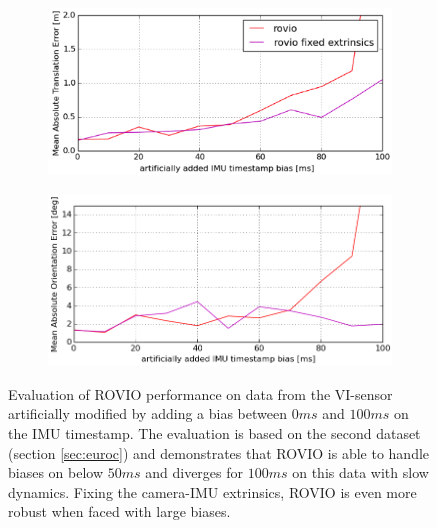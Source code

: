 \begin{figure}[h]
  \begin{subfigure}[b]{0.48\textwidth}
    \includegraphics[width=\textwidth]{images/artificial_bias_1.png}
    \caption{}
  \end{subfigure}
  \hfill
  \begin{subfigure}[b]{0.48\textwidth}
    \includegraphics[width=\textwidth]{images/artificial_bias_2.png}
    \caption{}
  \end{subfigure}
   \caption{Evaluation of ROVIO performance on data from the VI-sensor artificially modified by adding a bias between $0ms$ and $100ms$ on the IMU timestamp. The evaluation is based on the second dataset (section \ref{sec:euroc}) and demonstrates that ROVIO is able to handle biases on below $50ms$ and diverges for $100ms$ on this data with slow dynamics. Fixing the camera-IMU extrinsics, ROVIO is even more robust when faced with large biases.}
   \label{pics:timesync_artificial}
\end{figure}

